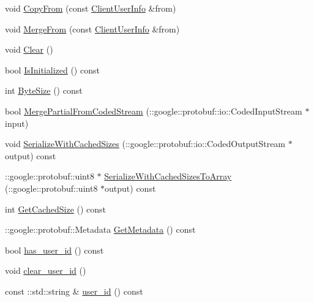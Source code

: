 \begin{DoxyCompactItemize}
void \hyperlink{class_i_m_1_1_base_define_1_1_client_user_info_a18d5034855814f3e8f72a1797beb6fe0}{Copy\+From} (const \hyperlink{class_i_m_1_1_base_define_1_1_client_user_info}{Client\+User\+Info} \&from)
\item 
void \hyperlink{class_i_m_1_1_base_define_1_1_client_user_info_ad7970d4da432e1a6f695ae164e2ff848}{Merge\+From} (const \hyperlink{class_i_m_1_1_base_define_1_1_client_user_info}{Client\+User\+Info} \&from)
\item 
void \hyperlink{class_i_m_1_1_base_define_1_1_client_user_info_a24c80146a04e777e26b0f18e5f2e80e0}{Clear} ()
\item 
bool \hyperlink{class_i_m_1_1_base_define_1_1_client_user_info_abb703ad6181759b9f32c6aac1b75f1c3}{Is\+Initialized} () const 
\item 
int \hyperlink{class_i_m_1_1_base_define_1_1_client_user_info_a0cf737acdacd8e471a9675cad9a5fe6e}{Byte\+Size} () const 
\item 
bool \hyperlink{class_i_m_1_1_base_define_1_1_client_user_info_a622eca555df252d574235825d2744f90}{Merge\+Partial\+From\+Coded\+Stream} (\+::google\+::protobuf\+::io\+::\+Coded\+Input\+Stream $\ast$input)
\item 
void \hyperlink{class_i_m_1_1_base_define_1_1_client_user_info_a177beefdea773421a737220b696488b0}{Serialize\+With\+Cached\+Sizes} (\+::google\+::protobuf\+::io\+::\+Coded\+Output\+Stream $\ast$output) const 
\item 
\+::google\+::protobuf\+::uint8 $\ast$ \hyperlink{class_i_m_1_1_base_define_1_1_client_user_info_afebe664eab5b7a1b777ed4f8e366af24}{Serialize\+With\+Cached\+Sizes\+To\+Array} (\+::google\+::protobuf\+::uint8 $\ast$output) const 
\item 
int \hyperlink{class_i_m_1_1_base_define_1_1_client_user_info_ae2e55d0c7b51b34d9fb2fee6c6a8377e}{Get\+Cached\+Size} () const 
\item 
\+::google\+::protobuf\+::\+Metadata \hyperlink{class_i_m_1_1_base_define_1_1_client_user_info_a1a4df74856bef7f006799764d4f539f3}{Get\+Metadata} () const 
\item 
bool \hyperlink{class_i_m_1_1_base_define_1_1_client_user_info_a3862f68f81960c6df71748f24ec34fca}{has\+\_\+user\+\_\+id} () const 
\item 
void \hyperlink{class_i_m_1_1_base_define_1_1_client_user_info_ac8e67a2cd791df971557c076110fb1dd}{clear\+\_\+user\+\_\+id} ()
\item 
const \+::std\+::string \& \hyperlink{class_i_m_1_1_base_define_1_1_client_user_info_aec41f6b5430b803a0f133fad27d678a8}{user\+\_\+id} () const 

\end{DoxyCompactItemize}
